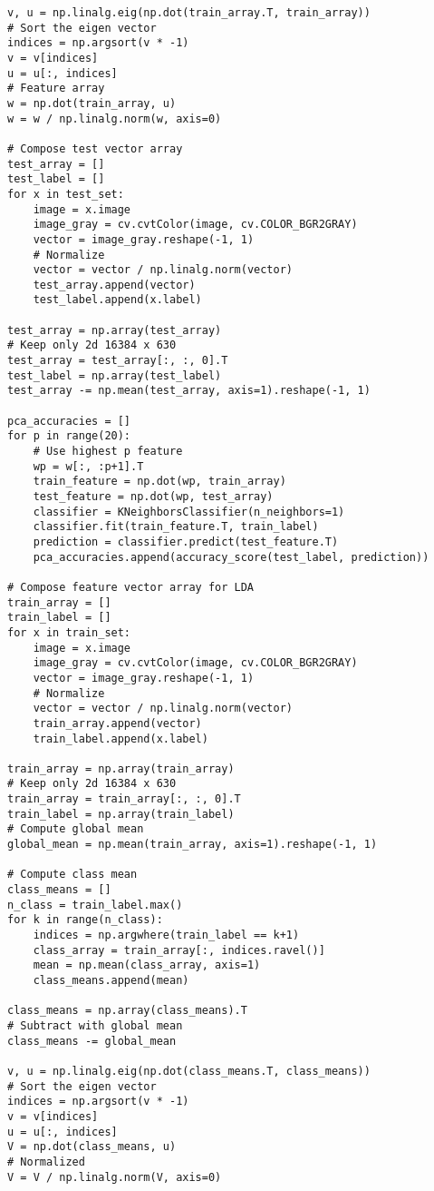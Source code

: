 \documentclass[11pt]{article}
\begin{document}
\begin{lstlisting}
v, u = np.linalg.eig(np.dot(train_array.T, train_array))
# Sort the eigen vector
indices = np.argsort(v * -1)
v = v[indices]
u = u[:, indices]
# Feature array
w = np.dot(train_array, u)
w = w / np.linalg.norm(w, axis=0)

# Compose test vector array
test_array = []
test_label = []
for x in test_set:
    image = x.image
    image_gray = cv.cvtColor(image, cv.COLOR_BGR2GRAY)
    vector = image_gray.reshape(-1, 1)
    # Normalize
    vector = vector / np.linalg.norm(vector)
    test_array.append(vector)
    test_label.append(x.label)
    
test_array = np.array(test_array)
# Keep only 2d 16384 x 630
test_array = test_array[:, :, 0].T
test_label = np.array(test_label)
test_array -= np.mean(test_array, axis=1).reshape(-1, 1)

pca_accuracies = []
for p in range(20):
    # Use highest p feature
    wp = w[:, :p+1].T
    train_feature = np.dot(wp, train_array)
    test_feature = np.dot(wp, test_array)
    classifier = KNeighborsClassifier(n_neighbors=1)
    classifier.fit(train_feature.T, train_label)
    prediction = classifier.predict(test_feature.T)
    pca_accuracies.append(accuracy_score(test_label, prediction))

# Compose feature vector array for LDA
train_array = []
train_label = []
for x in train_set:
    image = x.image
    image_gray = cv.cvtColor(image, cv.COLOR_BGR2GRAY)
    vector = image_gray.reshape(-1, 1)
    # Normalize
    vector = vector / np.linalg.norm(vector)
    train_array.append(vector)
    train_label.append(x.label)
    
train_array = np.array(train_array)
# Keep only 2d 16384 x 630
train_array = train_array[:, :, 0].T
train_label = np.array(train_label)
# Compute global mean
global_mean = np.mean(train_array, axis=1).reshape(-1, 1)

# Compute class mean
class_means = []
n_class = train_label.max()
for k in range(n_class):
    indices = np.argwhere(train_label == k+1)
    class_array = train_array[:, indices.ravel()]
    mean = np.mean(class_array, axis=1)
    class_means.append(mean)

class_means = np.array(class_means).T
# Subtract with global mean
class_means -= global_mean

v, u = np.linalg.eig(np.dot(class_means.T, class_means))
# Sort the eigen vector
indices = np.argsort(v * -1)
v = v[indices]
u = u[:, indices]
V = np.dot(class_means, u)
# Normalized 
V = V / np.linalg.norm(V, axis=0)


\end{lstlisting}
\end{document}
